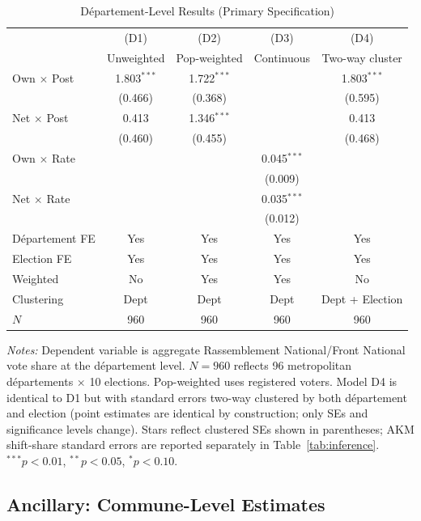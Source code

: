 \documentclass[12pt]{article}
\newcommand{\rn}{Rassemblement National}
\newcommand{\fn}{Front National}
\newcommand{\dept}{d\'{e}partement}
\newcommand{\depts}{d\'{e}partements}
\begin{document}
\begin{table}[H]
\centering
\caption{D\'{e}partement-Level Results (Primary Specification)}
\label{tab:dept}
\begin{threeparttable}
\begin{tabular}{@{}lcccc@{}}
\toprule
 & (D1) & (D2) & (D3) & (D4) \\
 & Unweighted & Pop-weighted & Continuous & Two-way cluster \\
\midrule
Own $\times$ Post & 1.803$^{***}$ & 1.722$^{***}$ & & 1.803$^{***}$ \\
 & (0.466) & (0.368) & & (0.595) \\[3pt]
Net $\times$ Post & 0.413 & 1.346$^{***}$ & & 0.413 \\
 & (0.460) & (0.455) & & (0.468) \\[3pt]
Own $\times$ Rate & & & 0.045$^{***}$ & \\
 & & & (0.009) & \\[3pt]
Net $\times$ Rate & & & 0.035$^{***}$ & \\
 & & & (0.012) & \\[3pt]
\midrule
D\'{e}partement FE & Yes & Yes & Yes & Yes \\
Election FE & Yes & Yes & Yes & Yes \\
Weighted & No & Yes & Yes & No \\
Clustering & Dept & Dept & Dept & Dept + Election \\
$N$ & 960 & 960 & 960 & 960 \\
\bottomrule
\end{tabular}
\begin{tablenotes}
\small
\item \textit{Notes:} Dependent variable is aggregate \rn{}/\fn{} vote share at the \dept{} level. $N = 960$ reflects 96 metropolitan \depts{} $\times$ 10 elections. Pop-weighted uses registered voters. Model D4 is identical to D1 but with standard errors two-way clustered by both \dept{} and election (point estimates are identical by construction; only SEs and significance levels change). Stars reflect clustered SEs shown in parentheses; AKM shift-share standard errors are reported separately in Table~\ref{tab:inference}. $^{***}p<0.01$, $^{**}p<0.05$, $^{*}p<0.10$.
\end{tablenotes}
\end{threeparttable}
\end{table}

\subsection{Ancillary: Commune-Level Estimates}
\end{document}
